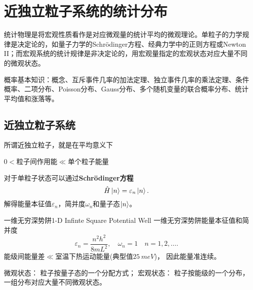\chapter{近独立粒子系统的统计分布}
统计物理是将宏观性质看作是对应微观量的统计平均的微观理论。单粒子的力学规律是决定论的，如量子力学的Schrödinger方程、经典力学中的正则方程或Newton II；而宏观系统的统计规律是非决定论的，用宏观量指定的宏观状态对应大量不同的微观状态。

概率基本知识：概念、互斥事件几率的加法定理、独立事件几率的乘法定理、条件概率、二项分布、Poisson分布、Gauss分布、多个随机变量的联合概率分布、统计平均值和涨落等。

\section{近独立粒子系统}

所谓近独立粒子，就是在平均意义下
\begin{center}
	$0<$粒子间作用能$\ll$单个粒子能量
\end{center}
对于单粒子状态可以通过\textbf{Schrödinger方程}
\[
	\hat H\left\vert n\right\rangle=\varepsilon_n\left\vert n\right\rangle.
\]
解得能量本征值$\varepsilon_n$，简并度$\omega_n$和量子态$\left\vert n\right\rangle$。
\begin{example}{一维无穷深势阱}{1-D Infinte Square Potential Well}
	一维无穷深势阱能量本征值和简并度
	\[
		\varepsilon_n=\frac{n^2h^2}{8mL^2},\quad\omega_n=1\quad n=1,2,\ldots.
	\]
	能级间能量差$\ll$室温下热运动能量(典型值$\SI{25}{meV}$)，
	因此能量准连续。
\end{example}
微观状态：
粒子按量子态的一个分配方式；
宏观状态：
粒子按能级的一个分布，%
一组分布对应大量不同微观状态。


